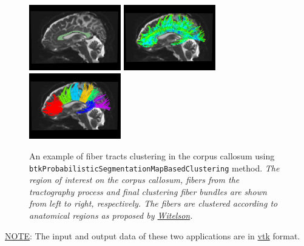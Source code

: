 \begin{description}
	\begin{figure}[h]
	\centering
        \includegraphics[width=4cm]{Corpus_Callosum-view2}
        \includegraphics[width=4cm]{Tractography-CC-view2}
        \includegraphics[width=4cm]{Clustering2-CC-view2}
        \caption{An example of fiber tracts clustering in the corpus callosum using \texttt{btkProbabilisticSegmentationMapBasedClustering} method.
        {\em The region of interest on the corpus callosum, fibers from the tractography process and final clustering fiber bundles are shown from left to right, respectively. The fibers are clustered according to anatomical regions as proposed by \href{brain.oxfordjournals.org/content/112/3/799}{Witelson}.}}
        \label{clustering2-fig}
        \end{figure}

\end{description}

\underline{NOTE}: The input and output data of these two applications are in \href{www.vtk.org/VTK/img/file-formats.pdf}{vtk} format.
